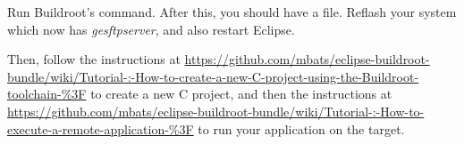 Run Buildroot's  command. After this, you should have a
 file. Reflash your system
which now has {\em gesftpserver}, and also restart Eclipse.

Then, follow the instructions at
\url{https://github.com/mbats/eclipse-buildroot-bundle/wiki/Tutorial-:-How-to-create-a-new-C-project-using-the-Buildroot-toolchain-%3F}
to create a new C project, and then the instructions at
\url{https://github.com/mbats/eclipse-buildroot-bundle/wiki/Tutorial-:-How-to-execute-a-remote-application-%3F}
to run your application on the target.
